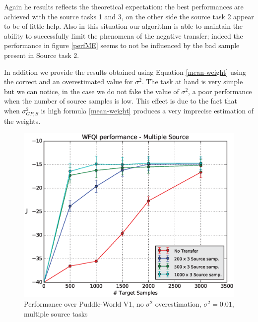     \vspace{3cm}

    \noindent Again he results reflects the theoretical expectation: the best performances are achieved
    with the source tasks 1 and 3, on the other side the source task 2 appear to be of little help.\newline
    Also in this situation our algorithm is able to maintain the ability to successfully
    limit the phenomena of the negative transfer; indeed the performance in figure \ref{perfME}
    seems to not be influenced by the bad sample present in Source task 2.\newline

    \noindent In addition we provide the results obtained using Equation \ref{mean-weight} using
    the correct and an overestimated value for $\sigma^{2}$. The task at hand is very simple but
    we can notice, in the case we do not fake the value of $\sigma^{2}$, a poor performance
    when the number of source samples is low. This effect is due to the fact that when $\sigma_{GP,S}^{2}$
    is high formula \ref{mean-weight} produces a very imprecise estimation of the weights.

    \begin{figure}[H]
      \centering
      \includegraphics[scale=0.6]{images/WFQIPerfM_V1_MEAN.eps}
      \caption{Performance over Puddle-World V1, no $\sigma^{2}$ overestimation, $\sigma^{2} = 0.01$, multiple source tasks}
      \label{}
    \end{figure}

